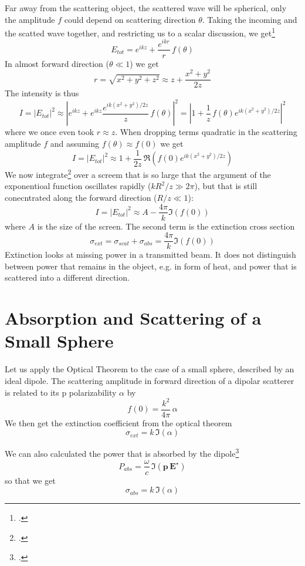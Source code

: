Far away from the scattering object, the scattered wave will be spherical, only the amplitude $f$ could depend on scattering direction $\theta$. Taking the incoming and the scatted wave together, and restricting us to a scalar discussion, we get\footcite{Newton:1976cz}
\[
 E_{tot} =  e^{i k z} + \frac{e^{i k r}}{r} \, f(\theta)
\]
In almost forward direction ($\theta \ll 1$) we get
\[
r = \sqrt{x^2 + y^2 + z^2} \approx z + \frac{x^2 + y^2}{2z }
\]
The intensity is thus
\[
 I = |E_{tot}|^2 \approx \left|e^{i k z} + e^{i k z} \frac{e^{i k (x^2 + y^2)/2z }}{z} \, f(\theta) \right| ^2 = \left|1 + \frac{1}{z} \, f(\theta) e^{i k (x^2 + y^2)/2z } \right| ^2
\]
where we once even took $r \approx z$. When dropping terms quadratic in the scattering amplitude $f$ and assuming $f(\theta) \approx f(0)$ we get
\[
 I = |E_{tot}|^2 \approx 1 +   \frac{1}{2 z} \, \Re  \left( f(0) e^{i k (x^2 + y^2)/2z } \right)
\]
We now integrate\footcite{Newton:1976cz} over a screem that is so large that the argument of the exponentioal function oscillates rapidly ($k R^2 / z \gg 2 \pi$), but that is still conecntrated along the forward direction ($R/z \ll 1$):
\[
 I = |E_{tot}|^2 \approx A  - \frac{4 \pi }{k} \Im ( f(0) )
\]
where $A$ is the size of the screen. The second term is the extinction cross section
\[
 \sigma_{ext} = \sigma_{scat}  + \sigma_{abs}  = \frac{4 \pi }{k} \Im ( f(0) )
\]
Extinction looks at missing power in a transmitted beam. It does not distinguish between power that remains in the object, e.g. in form of heat, and power that is scattered into a different direction.


\section{Absorption and Scattering of a Small Sphere}

Let us apply the Optical Theorem to the case of a small sphere, described by an ideal dipole.
The scattering amplitude in forward direction of a dipolar scatterer is related to its p polarizability $\alpha$ by 
\[
 f(0) = \frac{k^2}{4 \pi} \, \alpha
\]
We  then get the extinction coefficient from the optical theorem
\[
 \sigma_{ext} = k \, \Im ( \alpha )
\]

We can also calculated the power that is absorbed by the dipole\footcite[Chapter 8]{Novotny-Hecht2012}
\[
 P_{abs} = \frac{\omega}{c} \, \Im \left( \mathbf{p} \, \mathbf{E}^\star \right) 
\]
so that we get 
\[
 \sigma_{abs} = k \, \Im ( \alpha )
\]

